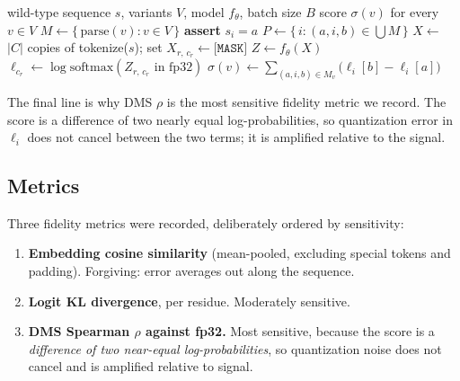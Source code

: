 \documentclass[11pt]{article}
\begin{document}
\begin{algorithm}[htb]
\caption{Masked-marginals variant scoring, as benchmarked. Cost is
$\lceil |P| / B \rceil$ forward passes and is independent of $|V|$, so an assay
with 16{,}000 variants over 900 positions costs the same as one with 900.}
\label{alg:mm}
\begin{algorithmic}[1]
\Require wild-type sequence $s$, variants $V$, model $f_\theta$, batch size $B$
\Ensure score $\sigma(v)$ for every $v \in V$
\State $M \gets \{\,\text{parse}(v) : v \in V\,\}$
  \State \textbf{assert} $s_i = a$
\EndFor
\State $P \gets \{\, i : (a,i,b) \in \bigcup M \,\}$ \label{ln:pos}
 \label{ln:batch}
  \State $X \gets$ $|C|$ copies of tokenize($s$); set $X_{r,\,c_r} \gets \texttt{[MASK]}$
  \State $Z \gets f_\theta(X)$ 
    \State $\ell_{c_r} \gets \log\mathrm{softmax}\!\left(Z_{r,\,c_r} \text{ in fp32}\right)$
  \EndFor
\EndFor
{}
  \State $\sigma(v) \gets \sum_{(a,i,b) \in M_v} \big(\ell_i[b] - \ell_i[a]\big)$
\EndFor
\end{algorithmic}
\end{algorithm}

The final line is why DMS $\rho$ is the most sensitive fidelity metric we record.
The score is a difference of two nearly equal log-probabilities, so quantization
error in $\ell_i$ does not cancel between the two terms; it is amplified relative
to the signal.

\subsection{Metrics}

Three fidelity metrics were recorded, deliberately ordered by sensitivity:

\begin{enumerate}
  \item \textbf{Embedding cosine similarity} (mean-pooled, excluding special
        tokens and padding). Forgiving: error averages out along the sequence.
  \item \textbf{Logit KL divergence}, per residue. Moderately sensitive.
  \item \textbf{DMS Spearman $\rho$ against fp32.} Most sensitive, because the
        score is a \emph{difference of two near-equal log-probabilities}, so
        quantization noise does not cancel and is amplified relative to signal.
\end{enumerate}
\end{document}
